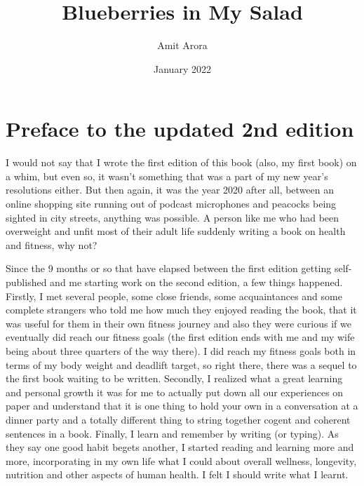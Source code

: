 \documentclass[
  oneside]{book}
\title{Blueberries in My Salad}
\author{Amit Arora}
\date{January 2022}
\begin{document}
\maketitle

{
\hypersetup{linkcolor=}
\setcounter{tocdepth}{1}
\tableofcontents
}
\hypertarget{preface-to-the-updated-2nd-edition}{%
\chapter{Preface to the updated 2nd edition}\label{preface-to-the-updated-2nd-edition}}

I would not say that I wrote the first edition of this book (also, my first book) on a whim, but even so, it wasn't something that was a part of my new year's resolutions either. But then again, it was the year 2020 after all, between an online shopping site running out of podcast microphones and peacocks being sighted in city streets, anything was possible. A person like me who had been overweight and unfit most of their adult life suddenly writing a book on health and fitness, why not?

Since the 9 months or so that have elapsed between the first edition getting self-published and me starting work on the second edition, a few things happened. Firstly, I met several people, some close friends, some acquaintances and some complete strangers who told me how much they enjoyed reading the book, that it was useful for them in their own fitness journey and also they were curious if we eventually did reach our fitness goals (the first edition ends with me and my wife being about three quarters of the way there). I did reach my fitness goals both in terms of my body weight and deadlift target, so right there, there was a sequel to the first book waiting to be written. Secondly, I realized what a great learning and personal growth it was for me to actually put down all our experiences on paper and understand that it is one thing to hold your own in a conversation at a dinner party and a totally different thing to string together cogent and coherent sentences in a book. Finally, I learn and remember by writing (or typing). As they say one good habit begets another, I started reading and learning more and more, incorporating in my own life what I could about overall wellness, longevity, nutrition and other aspects of human health. I felt I should write what I learnt.
\end{document}
